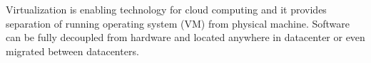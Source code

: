 


Virtualization is enabling technology for cloud computing and it provides separation of running operating system (\Ac{VM}) from physical machine. Software can be fully decoupled from hardware and located anywhere in datacenter or even migrated between datacenters. 

